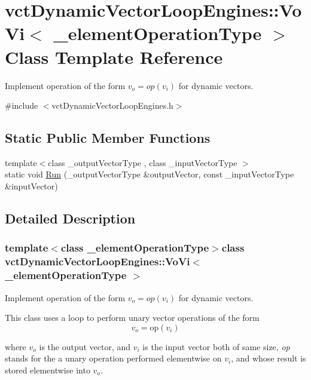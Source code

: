 \hypertarget{classvct_dynamic_vector_loop_engines_1_1_vo_vi}{\section{vct\-Dynamic\-Vector\-Loop\-Engines\-:\-:Vo\-Vi$<$ \-\_\-element\-Operation\-Type $>$ Class Template Reference}
\label{classvct_dynamic_vector_loop_engines_1_1_vo_vi}
}


Implement operation of the form $v_o = op(v_i)$ for dynamic vectors.  




{\ttfamily \#include $<$vct\-Dynamic\-Vector\-Loop\-Engines.\-h$>$}

\subsection*{Static Public Member Functions}
\begin{DoxyCompactItemize}
\item 
{\footnotesize template$<$class \-\_\-output\-Vector\-Type , class \-\_\-input\-Vector\-Type $>$ }\\static void \hyperlink{classvct_dynamic_vector_loop_engines_1_1_vo_vi_a5beea25301a89db0c5c75e21224afca2}{Run} (\-\_\-output\-Vector\-Type \&output\-Vector, const \-\_\-input\-Vector\-Type \&input\-Vector)
\end{DoxyCompactItemize}


\subsection{Detailed Description}
\subsubsection*{template$<$class \-\_\-element\-Operation\-Type$>$class vct\-Dynamic\-Vector\-Loop\-Engines\-::\-Vo\-Vi$<$ \-\_\-element\-Operation\-Type $>$}

Implement operation of the form $v_o = op(v_i)$ for dynamic vectors. 

This class uses a loop to perform unary vector operations of the form \[ v_{o} = \mathrm{op}(v_{i}) \]

where $v_{o}$ is the output vector, and $v_{i}$ is the input vector both of same size, {\itshape op} stands for the a unary operation performed elementwise on $v_{i}$, and whose result is stored elementwise into $v_{o}$.



